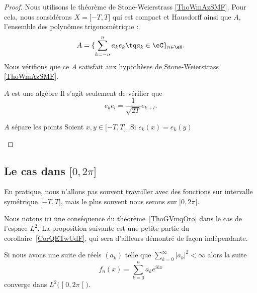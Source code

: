 \begin{proof}
    Nous utilisons le théorème de Stone-Weierstrass \ref{ThoWmAzSMF}. Pour cela, nous considérons \( X=\mathopen[ -T , T \mathclose]\) qui est compact et Hausdorff ainsi que \( A\), l'ensemble des polynômes trigonométrique :
    \begin{equation}
        A=\{ \sum_{k=-n}^na_ke_k\tq a_k\in \eC \}_{n\in \eN}.
    \end{equation}
    Nous vérifions que ce \( A\) satisfait aux hypothèses de Stone-Weierstrass \ref{ThoWmAzSMF}.
    \begin{subproof}
        \item[\( A\) est une algèbre]
            Il s'agit seulement de vérifier que
            \begin{equation}
                e_ke_l=\frac{1}{ \sqrt{ 2T } }e_{k+l}.
            \end{equation}
        \item[\( A\) sépare les points]
            Soient \( x,y\in \mathopen[ -T , T \mathclose]\). Si \( e_k(x)=e_k(y)\)
    \end{subproof}
\end{proof}

\subsection{Le cas dans \( \mathopen[ 0 , 2\pi \mathclose]\)}

En pratique, nous n'allons pas souvent travailler avec des fonctions sur intervalle symétrique \( \mathopen[ -T , T \mathclose]\), mais le plus souvent nous serons sur \( \mathopen[ 0 , 2\pi \mathclose]\).

Nous notons ici une conséquence du théorème~\ref{ThoGVmqOro} dans le cas de l'espace \( L^2\). La proposition suivante est une petite partie du corollaire~\ref{CorQETwUdF}, qui sera d'ailleurs démontré de façon indépendante.

\begin{proposition}
    Si nous avons une suite de réels \( (a_k)\) telle que \( \sum_{k=0}^{\infty}| a_k |^2<\infty\) alors la suite
    \begin{equation}
        f_n(x)=\sum_{k=0}^na_k e^{ikx}
    \end{equation}
    converge dans \( L^2\big( \mathopen] 0 , 2\pi \mathclose[ \big)\).
\end{proposition}


